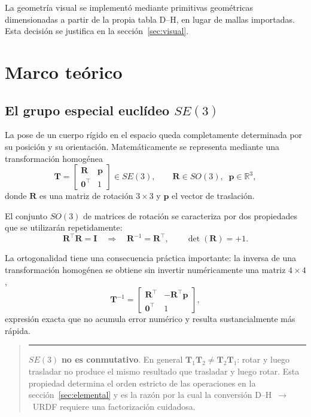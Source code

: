 \documentclass[11pt,a4paper]{article}
\newcommand{\mat}[1]{\mathbf{#1}}
\newenvironment{nota}
  {\begin{quote}\small\color{oscuro}\rule{2pt}{\baselineskip}\hspace{6pt}\ignorespaces}
  {\end{quote}}
\begin{document}
La geometría visual se implementó mediante primitivas geométricas
dimensionadas a partir de la propia tabla D--H, en lugar de mallas
importadas. Esta decisión se justifica en la sección~\ref{sec:visual}.

\section{Marco teórico}

\subsection{El grupo especial euclídeo \texorpdfstring{$SE(3)$}{SE(3)}}

La pose de un cuerpo rígido en el espacio queda completamente
determinada por su posición y su orientación. Matemáticamente se
representa mediante una transformación homogénea
\begin{equation}
\mat{T} =
\begin{bmatrix}
\mat{R} & \mat{p}\\
\mat{0}^{\top} & 1
\end{bmatrix}
\in SE(3),
\qquad
\mat{R}\in SO(3),\;\; \mat{p}\in\mathbb{R}^3,
\label{eq:se3}
\end{equation}
donde $\mat{R}$ es una matriz de rotación $3\times3$ y $\mat{p}$ el
vector de traslación.

El conjunto $SO(3)$ de matrices de rotación se caracteriza por dos
propiedades que se utilizarán repetidamente:
\begin{equation}
\mat{R}^{\top}\mat{R} = \mat{I}
\quad\Longrightarrow\quad
\mat{R}^{-1} = \mat{R}^{\top},
\qquad
\det(\mat{R}) = +1.
\label{eq:so3}
\end{equation}

La ortogonalidad tiene una consecuencia práctica importante: la inversa
de una transformación homogénea se obtiene sin invertir numéricamente
una matriz $4\times4$,
\begin{equation}
\mat{T}^{-1} =
\begin{bmatrix}
\mat{R}^{\top} & -\mat{R}^{\top}\mat{p}\\
\mat{0}^{\top} & 1
\end{bmatrix},
\label{eq:inversa}
\end{equation}
expresión exacta que no acumula error numérico y resulta
sustancialmente más rápida.

\begin{nota}
$SE(3)$ \textbf{no es conmutativo}. En general
$\mat{T}_1\mat{T}_2 \neq \mat{T}_2\mat{T}_1$: rotar y luego trasladar no
produce el mismo resultado que trasladar y luego rotar. Esta propiedad
determina el orden estricto de las operaciones en la
sección~\ref{sec:elemental} y es la razón por la cual la conversión
D--H~$\to$~URDF requiere una factorización cuidadosa.
\end{nota}
\end{document}
